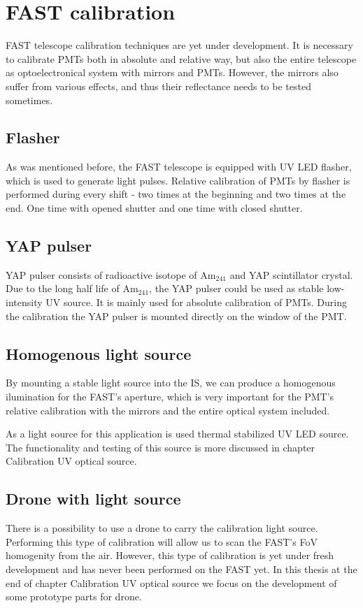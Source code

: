 \section{FAST calibration}
FAST telescope calibration techniques are yet under development. It is necessary to calibrate PMTs both in absolute and relative way, but also the entire telescope as optoelectronical system with mirrors and PMTs. However, the mirrors also suffer from various effects, and thus their reflectance needs to be tested sometimes.
\subsection{Flasher}
As was mentioned before, the FAST telescope is equipped with UV LED flasher, which is used to generate light pulses. Relative calibration of PMTs by flasher is performed during every shift - two times at the beginning and two times at the end. One time with opened shutter and one time with closed shutter.
\subsection{YAP pulser}
YAP pulser consists of radioactive isotope of $\textrm{Am}_{241}$ and YAP scintillator crystal. Due to the long half life of $\textrm{Am}_{241}$, the YAP pulser could be used as stable low-intensity UV source. 
It is mainly used for absolute calibration of PMTs. During the calibration the YAP pulser is mounted directly on the window of the PMT.

\subsection{Homogenous light source}
By mounting a stable light source into the IS, we can produce a homogenous ilumination for the FAST's aperture, which is very important for the PMT's relative calibration with the mirrors and the entire optical system included.
\par
As a light source for this application is used thermal stabilized UV LED source. The functionality and testing of this source is more discussed in chapter Calibration UV optical source.


\subsection{Drone with light source}
There is a possibility to use a drone to carry the calibration light source. Performing this type of calibration will allow us to scan the FAST's FoV homogenity from the air. However, this type of calibration is yet under fresh development and has never been performed on the FAST yet. In this thesis at the end of chapter Calibration UV optical source we focus on the development of some prototype parts for drone.





